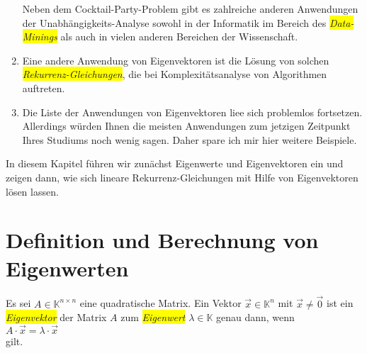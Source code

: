 \begin{enumerate}
      Neben dem Cocktail-Party-Problem gibt es zahlreiche anderen Anwendungen der
      Unabh\"angigkeits-Analyse sowohl in der Informatik im Bereich des 
      \colorbox{yellow}{\emph{Data-Minings}} als auch in vielen anderen Bereichen der Wissenschaft.
\item Eine andere Anwendung von Eigenvektoren ist die L\"osung von
      solchen \colorbox{yellow}{\emph{Rekurrenz-Gleichungen}}, die bei Komplexit\"atsanalyse von Algorithmen auftreten.
\item Die Liste der Anwendungen von Eigenvektoren lie\3e sich problemlos fortsetzen.  Allerdings
      w\"urden Ihnen die meisten Anwendungen zum jetzigen Zeitpunkt Ihres Studiums noch wenig sagen.
      Daher spare ich mir hier weitere Beispiele.
\end{enumerate}
In diesem Kapitel f\"uhren wir zun\"achst Eigenwerte und Eigenvektoren ein und zeigen dann, wie sich 
lineare Rekurrenz-Gleichungen mit Hilfe von Eigenvektoren l\"osen lassen.  
\pagebreak

\section{Definition und Berechnung von Eigenwerten}
\begin{Definition}[Eigenwert]
Es sei $A \in \mathbb{K}^{n \times n}$ eine quadratische Matrix.  Ein Vektor $\vec{x} \in \mathbb{K}^n$ mit $\vec{x} \not=\vec{0}$
ist ein \colorbox{yellow}{\emph{Eigenvektor}} der Matrix $A$ zum \colorbox{yellow}{\emph{Eigenwert}} $\lambda \in \mathbb{K}$ genau dann, wenn  
\\[0.2cm]
\hspace*{1.3cm}
$A \cdot \vec{x} = \lambda \cdot \vec{x}$
\\[0.2cm]
gilt.  \eoxs
\end{Definition}

